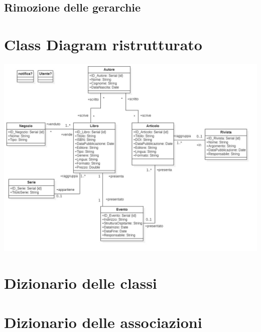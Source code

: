         \subsection{Rimozione delle gerarchie}
    
    \section{Class Diagram ristrutturato}
    \includegraphics[scale=0.25]{Immagini/UMLris_v1_0.png}
        
    \section{Dizionario delle classi}
        
    \section{Dizionario delle associazioni}